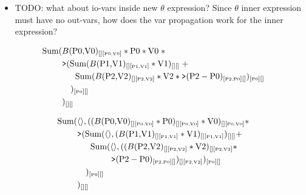 
\begin{itemize}
  \item TODO: what about io-vars inside new $\theta$ expression? Since
  $\theta$ inner expression must have no out-vars, how does the var propagation
  work for the inner expression?
\end{itemize}


\begin{align*}
\calcsum( & B(\v{P0,V0})_{[][\vv{P0,V0}]} * \v{P0} * \v{V0} \; *
\\
& \calcgt(\calcsum(B(\v{P1,V1})_{[][\vv{P1,V1}]} * \v{V1})_{[][]} \; +
\\
& \quad \;\; \calcsum(B(\v{P2,V2})_{[][\vv{P2,V2}]} * \v{V2} *
                 \calcgt(\v{P2}-\v{P0})_{[\vv{P2,P0}][]})_{[\vv{P0}][]}
\\
& \quad )_{[\vv{P0}][]}
\\
& )_{[][]}
\end{align*}

\begin{align*}
\calcsum( & \tuple{},
    ((B(\v{P0,V0})_{[][\vv{P0,V0}]}
      * \v{P0})_{[][\vv{P0,V0}]}
      * \v{V0})_{[][\vv{P0,V0}]} *
\\
& \calcgt(\calcsum(\tuple{},
    (B(\v{P1,V1})_{[][\vv{P1,V1}]}
     * \v{V1})_{[][\vv{P1,V1}]})_{[][]} +
\\
& \quad \;\; \calcsum(\tuple{},
    ((B(\v{P2,V2})_{[][\vv{P2,V2}]} * \v{V2})_{[][\vv{P2,V2}]} *
\\
& \qquad \qquad
    \calcgt(\v{P2}-\v{P0})_{[\vv{P2,P0}][]})_{[][\vv{P2,V2}]})_{[\vv{P0}][]}
\\
& \quad )_{[\vv{P0}][]}
\\
& )_{[][]}
\end{align*}

